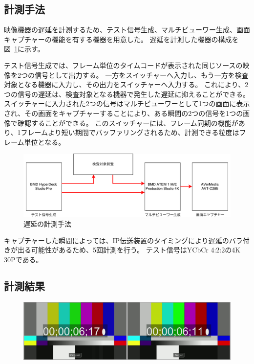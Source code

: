 \subsection{計測手法}

映像機器の遅延を計測するため、テスト信号生成、マルチビューワー生成、画面キャプチャーの機能を有する機器を用意した。
遅延を計測した機器の構成を図~\ref{fig:evaluate-diagram}に示す。

テスト信号生成では、フレーム単位のタイムコードが表示された同じソースの映像を2つの信号として出力する。
一方をスイッチャーへ入力し、もう一方を検査対象となる機器に入力し、その出力をスイッチャーへ入力する。
これにより、2つの信号の遅延は、検査対象となる機器で発生した遅延に抑えることができる。
スイッチャーに入力された2つの信号はマルチビューワーとして1つの画面に表示され、その画面をキャプチャーすることにより、ある瞬間の2つの信号を1つの画像で確認することができる。
このスイッチャーには、フレーム同期の機能があり、1フレームより短い期間でバッファリングされるため、計測できる粒度はフレーム単位となる。

\begin{figure}[htbp]
  \begin{center}
    \includegraphics[bb=0 0 697 212,width=15cm]{img/evaluate-diagram.pdf}
  \end{center}
  \caption{遅延の計測手法}
  \label{fig:evaluate-diagram}
\end{figure}

キャプチャーした瞬間によっては、IP伝送装置のタイミングにより遅延のバラ付きが出る可能性があるため、5回計測を行う。
テスト信号はYCbCr 4:2:2の4K 30Pである。

\subsection{計測結果}

\begin{figure}[htbp]
  \begin{center}
    \includegraphics[bb=0 0 1920 540,width=14cm]{img/evaluate-delay-software-1.png}
  \end{center}
  \caption[ソフトウェア実装による1回目の遅延計測のキャプチャー画像]{}
  \label{fig:evaluate-delay-software-1}
\end{figure}

